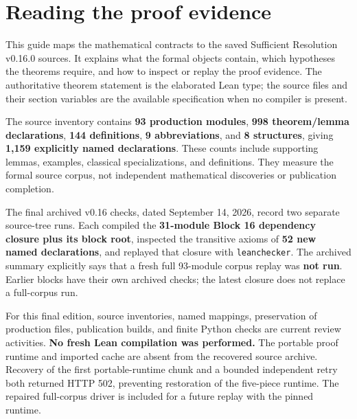 \documentclass[11pt]{article}
\begin{document}
\KomorebiCover
{}

\hypersetup{pageanchor=false}

\hypersetup{pageanchor=true}
\setcounter{tocdepth}{1}
\begingroup\small\setlength{\parskip}{0pt}\tableofcontents\endgroup\clearpage
\hypertarget{reading-the-proof-evidence}{%
\section{Reading the proof evidence}\label{reading-the-proof-evidence}}

This guide maps the mathematical contracts to the saved Sufficient
Resolution v0.16.0 sources. It explains what the formal objects contain,
which hypotheses the theorems require, and how to inspect or replay the
proof evidence. The authoritative theorem statement is the elaborated
Lean type; the source files and their section variables are the
available specification when no compiler is present.

The source inventory contains \textbf{93 production modules},
\textbf{998 theorem/lemma declarations}, \textbf{144 definitions},
\textbf{9 abbreviations}, and \textbf{8 structures}, giving
\textbf{1,159 explicitly named declarations}. These counts include
supporting lemmas, examples, classical specializations, and definitions.
They measure the formal source corpus, not independent mathematical
discoveries or publication completion.

The final archived v0.16 checks, dated September 14, 2026, record two
separate source-tree runs. Each compiled the \textbf{31-module Block 16
dependency closure plus its block root}, inspected the transitive axioms
of \textbf{52 new named declarations}, and replayed that closure with
\texttt{leanchecker}. The archived summary explicitly
says that a fresh full 93-module corpus replay was \textbf{not run}.
Earlier blocks have their own archived checks; the latest closure does
not replace a full-corpus run.

For this final edition, source inventories, named mappings, preservation
of production files, publication builds, and finite Python checks are
current review activities. \textbf{No fresh Lean compilation was
performed.} The portable proof runtime and imported
\texttt{} cache are absent from the recovered
source archive. Recovery of the first portable-runtime chunk and a
bounded independent retry both returned HTTP 502, preventing restoration
of the five-piece runtime. The repaired full-corpus driver is included
for a future replay with the pinned runtime.
\end{document}
